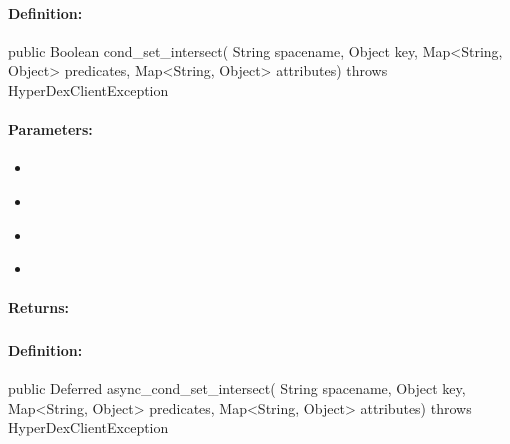 \paragraph{Definition:}
\begin{javacode}
public Boolean cond_set_intersect(
        String spacename,
        Object key,
        Map<String, Object> predicates,
        Map<String, Object> attributes) throws HyperDexClientException
\end{javacode}

\paragraph{Parameters:}
\begin{itemize}[noitemsep]
\item {}\\

\item {}\\

\item {}\\

\item {}\\

\end{itemize}

\paragraph{Returns:}


\pagebreak
\subsubsection{}
\label{api:java:async_cond_set_intersect}


\paragraph{Definition:}
\begin{javacode}
public Deferred async_cond_set_intersect(
        String spacename,
        Object key,
        Map<String, Object> predicates,
        Map<String, Object> attributes) throws HyperDexClientException
\end{javacode}

